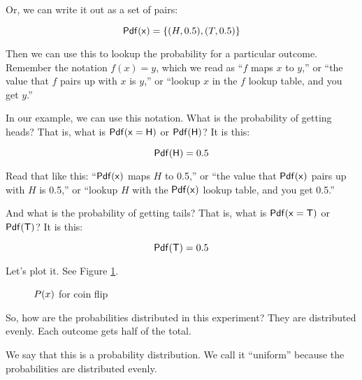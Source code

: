 \documentclass[../../../main.tex]{subfiles}
\begin{document}
\noindent
Or, we can write it out as a set of pairs:

\begin{equation*}
    \Pdf{\RandVarVal/} = \{ (H, 0.5), (T, 0.5) \}
\end{equation*}

\noindent
Then we can use this to lookup the probability for a particular outcome. Remember the notation $f(x) = y$, which we read as ``$f$ maps $x$ to $y$,'' or ``the value that $f$ pairs up with $x$ is $y$,'' or ``lookup $x$ in the $f$ lookup table, and you get $y$.'' 

In our example, we can use this notation. What is the probability of getting heads? That is, what is $\Pdf{\RandVarVal/ = H}$ or $\mathsf{Pdf(H)}$? It is this:

\begin{equation*}
    \mathsf{Pdf(H)} = 0.5
\end{equation*}

\noindent
Read that like this: ``$\Pdf{\RandVarVal/}$ maps $H$ to 0.5,'' or ``the value that $\Pdf{\RandVarVal/}$ pairs up with $H$ is 0.5,'' or ``lookup $H$ with the $\Pdf{\RandVarVal/}$ lookup table, and you get 0.5.''

And what is the probability of getting tails? That is, what is $\Pdf{\RandVarVal/ = T}$ or $\mathsf{Pdf(T)}$? It is this:

\begin{equation*}
    \mathsf{Pdf(T)} = 0.5
\end{equation*}

\noindent
Let's plot it. See Figure \ref{plot:example-1}.

\begin{figure}[ht]
  \caption{\label{plot:example-1} $\Probability{\RandVarVal/}$ for coin flip}
\end{figure}

So, how are the probabilities distributed in this experiment? They are distributed evenly. Each outcome gets half of the total. 

We say that this is a  probability distribution. We call it ``uniform'' because the probabilities are distributed evenly.
\end{document}
